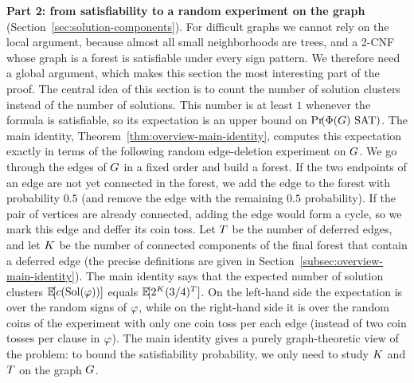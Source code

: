 \medskip
\noindent\textbf{Part 2: from satisfiability to a random experiment on the
graph} (Section~\ref{sec:solution-components}). For difficult graphs we cannot
rely on the local argument, because almost all small neighborhoods are trees,
and a 2-CNF whose graph is a forest is satisfiable under every sign pattern.
We therefore
need a global argument, which makes this section the most interesting part of the proof. The central idea of this section is to count the number of solution clusters instead of
the number of solutions. This number is at least \(1\) whenever the formula is
satisfiable, so its expectation is an upper bound on
\(\Prx{\rform{\Gin}\SAT}\). The main identity,
Theorem~\ref{thm:overview-main-identity}, computes this expectation exactly in
terms of the following random edge-deletion experiment on \(G\). We go
through the edges of \(G\) in a fixed order and build a forest. 
If the two endpoints of
an edge are not yet connected in the forest, we add the
edge to the forest with probability $0.5$ (and remove the edge with the remaining $0.5$ probability). 
If the pair of vertices are already connected, adding the edge
would form a cycle, so we mark this edge and deffer its coin toss.
Let
\(T\) be the number of deferred edges, and let \(K\) be the number of
connected components of the final forest that contain a deferred edge (the precise
definitions are given in Section~\ref{subsec:overview-main-identity}). The main
identity says that the expected number of solution clusters \(\Ex{\solcomp{\fml}}\) equals
\(\Ex{2^{\Kdef}(3/4)^{\Tdef}}\). On the left-hand side the expectation is over
the random signs of \(\varphi\), while on the right-hand side it is over the random coins of the
experiment with only one coin toss per each edge (instead of two coin tosses per clause in \(\varphi\)). The main identity gives
a purely graph-theoretic view of the problem: to bound the satisfiability
probability, we only need to study \(K\) and \(T\) on the graph
\(G\).

